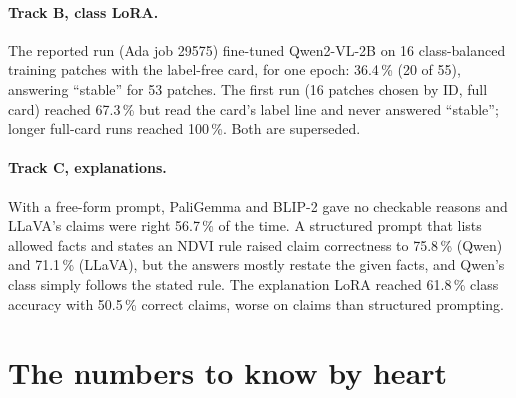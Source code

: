 \paragraph{Track B, class LoRA.} The reported run (Ada job 29575) fine-tuned Qwen2-VL-2B on 16 class-balanced training patches with the label-free card, for one epoch: 36.4\,\% (20 of 55), answering ``stable'' for 53 patches. The first run (16 patches chosen by ID, full card) reached 67.3\,\% but read the card's label line and never answered ``stable''; longer full-card runs reached 100\,\%. Both are superseded.

\paragraph{Track C, explanations.} With a free-form prompt, PaliGemma and BLIP-2 gave no checkable reasons and LLaVA's claims were right 56.7\,\% of the time. A structured prompt that lists allowed facts and states an NDVI rule raised claim correctness to 75.8\,\% (Qwen) and 71.1\,\% (LLaVA), but the answers mostly restate the given facts, and Qwen's class simply follows the stated rule. The explanation LoRA reached 61.8\,\% class accuracy with 50.5\,\% correct claims, worse on claims than structured prompting.

\section{The numbers to know by heart}

